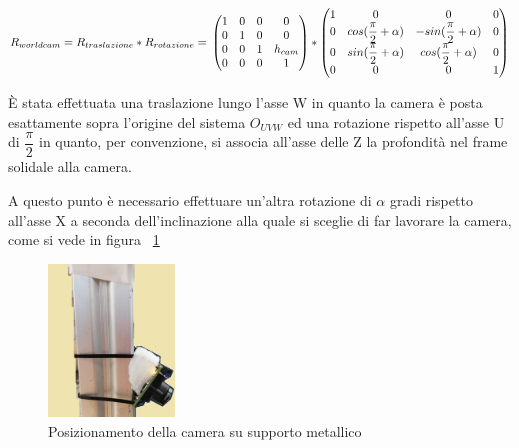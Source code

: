 \begin{equation*}
R_{worldcam} = R_{traslazione} * R_{rotazione} =\\
\begin{pmatrix}
1 & 0 & 0 & 0 \\
0 & 1 & 0 & 0 \\
0 & 0 & 1 & h_{cam} \\
0 & 0 & 0 & 1 \\
\end{pmatrix} *
\begin{pmatrix}
1 & 0 & 0 & 0 \\
0 & cos(\dfrac{\pi}{2}+\alpha) & -sin(\dfrac{\pi}{2}+\alpha) & 0 \\
0 & sin(\dfrac{\pi}{2}+\alpha) & cos(\dfrac{\pi}{2}+\alpha) & 0 \\
0 & 0 & 0 & 1 \\
\end{pmatrix}
\end{equation*}

È stata effettuata una traslazione lungo l'asse W in quanto la camera è posta esattamente sopra l'origine del sistema $O_{UVW}$ ed una rotazione rispetto all'asse U di $ \dfrac{\pi}{2}$ in quanto, per convenzione, si associa all'asse delle Z la profondità nel frame solidale alla camera.

A questo punto è necessario effettuare un'altra rotazione di $\alpha$ gradi rispetto all'asse X a seconda dell'inclinazione alla quale si sceglie di far lavorare la camera, come si vede in figura ~\ref{fig:cameraSupport}

\begin{figure}
	\centering
	\includegraphics[width=0.3\textwidth]{Immagini/CameraSupport.png}
	\caption{Posizionamento della camera su supporto metallico}
	\label{fig:cameraSupport}
\end{figure}

